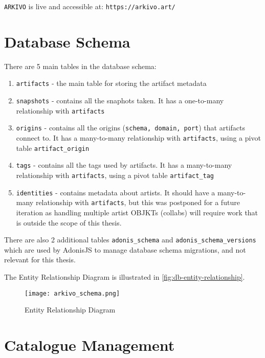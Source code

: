 \vspace{0.5cm}

\texttt{ARKIVO} is live and accessible at: \texttt{https://arkivo.art/}


\section{Database Schema}

There are 5 main tables in the database schema:

\begin{enumerate}
	\item \texttt{artifacts} - the main table for storing the artifact metadata
	\item \texttt{snapshots} - contains all the snaphots taken. It has a one-to-many relationship with \texttt{artifacts}
	\item \texttt{origins} - contains all the origins (\texttt{schema, domain, port}) that artifacts connect to. It has a many-to-many relationship with \texttt{artifacts}, using a pivot table \texttt{artifact\_origin}
	\item \texttt{tags} - contains all the tags used by artifacts. It has a many-to-many relationship with \texttt{artifacts}, using a pivot table \texttt{artifact\_tag}
	\item \texttt{identities} - contains metadata about artists. It should have a many-to-many relationship with \texttt{artifacts}, but this was postponed for a future iteration as handling multiple artist OBJKTs (collabs) will require work that is outside the scope of this thesis.
\end{enumerate}

There are also 2 additional tables \texttt{adonis\_schema} and \texttt{adonis\_schema\_versions} which are used by AdonisJS to manage database schema migrations, and not relevant for this thesis.

The Entity Relationship Diagram is illustrated in \autoref{fig:db-entity-relationship}.


\begin{figure}[H]
    \centering
    \texttt{[image: arkivo\_schema.png]}
    \caption[Entity Relationship Diagram]{Entity Relationship Diagram}
    \label{fig:db-entity-relationship}
\end{figure}



\section{Catalogue Management}

